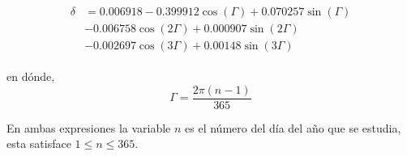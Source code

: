 \begin{align} \label{eq:declinacion_precisa}
	\begin{aligned}
		\delta & = 0.006918 - 0.399912\cos\left(\Gamma \right) + 0.070257\sin(\Gamma) \\
		& -0.006758\cos\left(2\Gamma \right)  + 0.000907\sin\left(2\Gamma \right)  \\
		& -0.002697\cos\left(3\Gamma \right) + 0.00148\sin\left(3\Gamma \right)
	\end{aligned}
\end{align}

en dónde,
\begin{equation}
\Gamma = \frac{2\pi\left(n-1 \right) }{365}
\end{equation}

En ambas expresiones la variable $n$ es el número del día del año que se estudia, esta satisface $1\leq n \leq 365$.